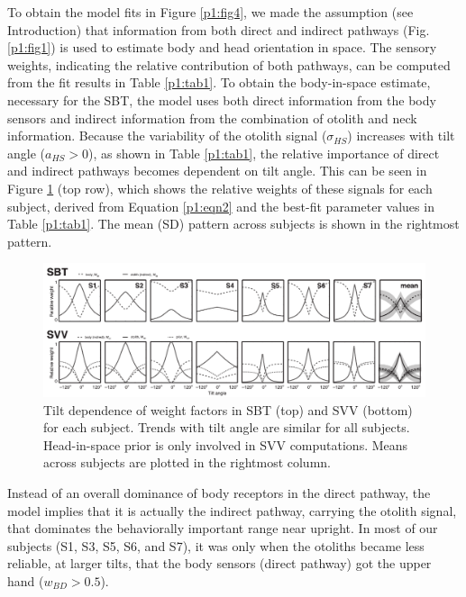 To obtain the model fits in Figure \ref{p1:fig4}, we made the assumption (see Introduction) that information from both direct and indirect pathways (Fig. \ref{p1:fig1}) is used to estimate body and head orientation in space. The sensory weights, indicating the relative contribution of both pathways, can be computed from the fit results in Table \ref{p1:tab1}. To obtain the body-in-space estimate, necessary for the SBT, the model uses both direct information from the body sensors and indirect information from the combination of otolith and neck information. Because the variability of the otolith signal ($\sigma_{HS}$) increases with tilt angle ($a_{HS} > 0$), as shown in Table \ref{p1:tab1}, the relative importance of direct and indirect pathways becomes dependent on tilt angle. This can be seen in Figure \ref{p1:fig5} (top row), which shows the relative weights of these signals for each subject, derived from Equation \ref{p1:eqn2} and the best-fit parameter values in Table \ref{p1:tab1}. The mean (\textpm SD) pattern across subjects is shown in the rightmost pattern. 

\begin{figure}
    \includegraphics[width=1.0\textwidth]{src/paper1/figure5.pdf}
    
    \caption{Tilt dependence of weight factors in SBT (top) and SVV (bottom) for each subject. Trends with tilt angle are similar for all subjects. Head-in-space prior is only involved in SVV computations. Means across subjects are plotted in the rightmost column.}
    \label{p1:fig5}
\end{figure}

Instead of an overall dominance of body receptors in the direct pathway, the model implies that it is actually the indirect pathway, carrying the otolith signal, that dominates the behaviorally important range near upright. In most of our subjects (S1, S3, S5, S6, and S7), it was only when the otoliths became less reliable, at larger tilts, that the body sensors (direct pathway) got the upper hand ($w_{BD} > 0.5$). 

